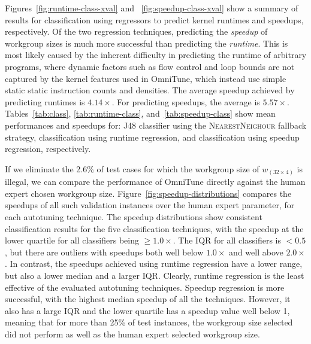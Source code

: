 \documentclass[nonatbib,preprint,10pt]{sigplanconf}
\begin{document}
Figures~\ref{fig:runtime-class-xval} and ~\ref{fig:speedup-class-xval}
show a summary of results for classification using regressors to
predict kernel runtimes and speedups, respectively. Of the two
regression techniques, predicting the \emph{speedup} of workgroup
sizes is much more successful than predicting the \emph{runtime}. This
is most likely caused by the inherent difficulty in predicting the
runtime of arbitrary programs, where dynamic factors such as flow
control and loop bounds are not captured by the kernel features used
in OmniTune, which instead use simple static static instruction counts
and densities. The average speedup achieved by predicting runtimes is
$4.14\times$. For predicting speedups, the average is $5.57\times$.
Tables~\ref{tab:class}, \ref{tab:runtime-class},
and~\ref{tab:speedup-class} show mean performances and speedups for:
J48 classifier using the \textsc{NearestNeighour} fallback strategy,
classification using runtime regression, and classification using
speedup regression, respectively.

If we eliminate the 2.6\% of test cases for which the workgroup size
of $w_{(32 \times 4)}$ is illegal, we can compare the performance of
OmniTune directly against the human expert chosen workgroup
size. Figure~\ref{fig:speedup-distributions} compares the speedups of
all such validation instances over the human expert parameter, for
each autotuning technique. The speedup distributions show consistent
classification results for the five classification techniques, with
the speedup at the lower quartile for all classifiers being
$\ge 1.0\times$. The IQR for all classifiers is $< 0.5$, but there are
outliers with speedups both well below $1.0\times$ and well above
$2.0\times$. In contrast, the speedups achieved using runtime
regression have a lower range, but also a lower median and a larger
IQR. Clearly, runtime regression is the least effective of the
evaluated autotuning techniques. Speedup regression is more
successful, with the highest median speedup of all the
techniques. However, it also has a large IQR and the lower quartile
has a speedup value well below 1, meaning that for more than 25\% of
test instances, the workgroup size selected did not perform as well as
the human expert selected workgroup size.

\end{document}
